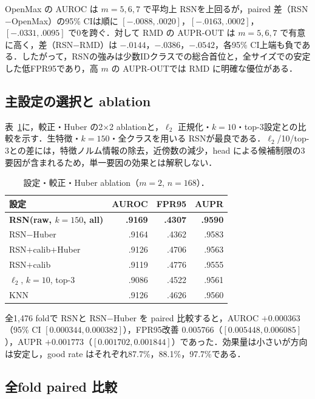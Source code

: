 \documentclass[uplatex,dvipdfmx,a4paper,10pt,twocolumn]{bxjsarticle}
\newcommand{\RSN}{RSN}
\newcommand{\knn}{KNN}
\begin{document}
OpenMax の AUROC は $m=5,6,7$ で平均上 \RSN を上回るが，paired 差（\RSN$-$OpenMax）の95\% CIは順に $[-.0088,.0020]$，$[-.0163,.0002]$，$[-.0331,.0095]$ で0を跨ぐ．対して RMD の AUPR-OUT は $m=5,6,7$ で有意に高く，差（\RSN$-$RMD）は $-.0144$，$-.0386$，$-.0542$，各95\% CI上端も負である．したがって，\RSN の強みは少数IDクラスでの総合首位と，全サイズでの安定した低FPR95であり，高 $m$ の AUPR-OUTでは RMD に明確な優位がある．

\subsection{主設定の選択と ablation}

表~\ref{tab:ablation}に，較正・Huber の2$\times$2 ablationと，$\ell_2$ 正規化・$k=10$・top-3設定との比較を示す．生特徴・$k=150$・全クラスを用いる \RSN が最良である．$\ell_2$/10/top-3との差には，特徴ノルム情報の除去，近傍数の減少，head による候補制限の3要因が含まれるため，単一要因の効果とは解釈しない．

\begin{table}[t]
\centering
\scriptsize
\caption{設定・較正・Huber ablation（$m=2$, $n=168$）．}
\label{tab:ablation}
\begin{tabular}{lrrr}
\toprule
設定 & AUROC & FPR95 & AUPR\\
\midrule
\textbf{\RSN (raw, $k=150$, all)} & \textbf{.9169} & \textbf{.4307} & \textbf{.9590}\\
\RSN$-$Huber & .9164 & .4362 & .9583\\
\RSN$+$calib$+$Huber & .9126 & .4706 & .9563\\
\RSN$+$calib & .9119 & .4776 & .9555\\
$\ell_2$, $k=10$, top-3 & .9086 & .4522 & .9561\\
\knn & .9126 & .4626 & .9560\\
\bottomrule
\end{tabular}
\end{table}

全1,476 foldで \RSN と \RSN$-$Huber を paired 比較すると，AUROC $+0.000363$（95\% CI $[0.000344,0.000382]$），FPR95改善 $0.005766$（$[0.005448,0.006085]$），AUPR $+0.001773$（$[0.001702,0.001844]$）であった．効果量は小さいが方向は安定し，good rate はそれぞれ87.7\%，88.1\%，97.7\%である．

\subsection{全fold paired 比較}
\end{document}
